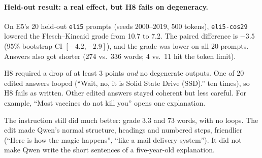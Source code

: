 \paragraph{Held-out result: a real effect, but H8 fails on degeneracy.}
On E5's 20 held-out \texttt{eli5} prompts (seeds 2000--2019, 500 tokens), \texttt{eli5-cos29} lowered the Flesch--Kincaid grade from 10.7 to 7.2. The paired difference is $-3.5$ (95\% bootstrap CI $[-4.2,-2.9]$), and the grade was lower on all 20 prompts. Answers also got shorter (274 vs.\ 336 words; 4 vs.\ 11 hit the token limit).

H8 required a drop of at least 3 points \emph{and} no degenerate outputs. One of 20 edited answers looped (``Wait, no, it is Solid State Drive (SSD).'' ten times), so H8 fails as written. Other edited answers stayed coherent but less careful. For example, ``Most vaccines do not kill you'' opens one explanation.

The instruction still did much better: grade 3.3 and 73 words, with no loops. The edit made Qwen's normal structure, headings and numbered steps, friendlier (``Here is how the magic happens'', ``like a mail delivery system''). It did not make Qwen write the short sentences of a five-year-old explanation.
